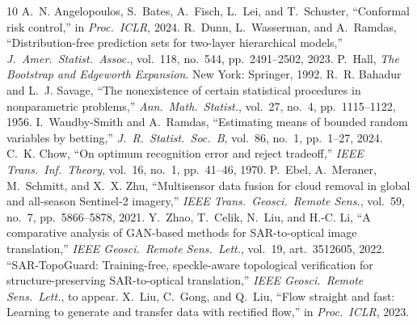 \documentclass[11pt,a4paper]{article}
\theoremstyle{definition}
\theoremstyle{remark}
\newcommand{\1}{\mathbf{1}}
\begin{document}
\begin{thebibliography}{10}
 A.~N. Angelopoulos, S.~Bates, A.~Fisch, L.~Lei, and T.~Schuster, ``Conformal risk control,'' in \emph{Proc.\ ICLR}, 2024.
 R.~Dunn, L.~Wasserman, and A.~Ramdas, ``Distribution-free prediction sets for two-layer hierarchical models,'' \emph{J.\ Amer.\ Statist.\ Assoc.}, vol.~118, no.~544, pp.~2491--2502, 2023.
 P.~Hall, \emph{The Bootstrap and Edgeworth Expansion}. New York: Springer, 1992.
 R.~R. Bahadur and L.~J. Savage, ``The nonexistence of certain statistical procedures in nonparametric problems,'' \emph{Ann.\ Math.\ Statist.}, vol.~27, no.~4, pp.~1115--1122, 1956.
 I.~Waudby-Smith and A.~Ramdas, ``Estimating means of bounded random variables by betting,'' \emph{J.\ R.\ Statist.\ Soc.\ B}, vol.~86, no.~1, pp.~1--27, 2024.
 C.~K. Chow, ``On optimum recognition error and reject tradeoff,'' \emph{IEEE Trans.\ Inf.\ Theory}, vol.~16, no.~1, pp.~41--46, 1970.
 P.~Ebel, A.~Meraner, M.~Schmitt, and X.~X. Zhu, ``Multisensor data fusion for cloud removal in global and all-season Sentinel-2 imagery,'' \emph{IEEE Trans.\ Geosci.\ Remote Sens.}, vol.~59, no.~7, pp.~5866--5878, 2021.
 Y.~Zhao, T.~Celik, N.~Liu, and H.-C. Li, ``A comparative analysis of GAN-based methods for SAR-to-optical image translation,'' \emph{IEEE Geosci.\ Remote Sens.\ Lett.}, vol.~19, art.~3512605, 2022.
 ``SAR-TopoGuard: Training-free, speckle-aware topological verification for structure-preserving SAR-to-optical translation,'' \emph{IEEE Geosci.\ Remote Sens.\ Lett.}, to appear.
 X.~Liu, C.~Gong, and Q.~Liu, ``Flow straight and fast: Learning to generate and transfer data with rectified flow,'' in \emph{Proc.\ ICLR}, 2023.
\end{thebibliography}
\end{document}
